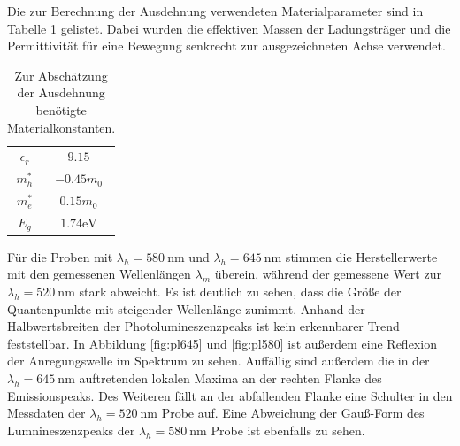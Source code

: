 Die zur Berechnung der Ausdehnung verwendeten Materialparameter sind in Tabelle \ref{tab:const} gelistet. Dabei wurden die effektiven Massen der Ladungsträger und die Permittivität für eine Bewegung senkrecht zur ausgezeichneten Achse verwendet.
\begin{table}[H]
  \centering
  \caption{Zur Abschätzung der Ausdehnung benötigte Materialkonstanten. \cite{dissArens}}
  \label{tab:const}
  \begin{tabular}{c|c}
    \toprule
    $\epsilon_r $ & $ 9.15$ \\
    $m^*_h$ & $ -0.45 m_0$ \\
    $m^*_e $ & $ 0.15 m_0$ \\
    $E_g $ & $1.74\si{\electronvolt}$ \\
    \bottomrule
  \end{tabular}
\end{table}

Für die Proben mit $\lambda_h=\SI{580}{\nano\meter}$ und $\lambda_h=\SI{645}{\nano\meter}$ stimmen die Herstellerwerte mit den gemessenen Wellenlängen $\lambda_m$ überein, während der gemessene Wert zur $\lambda_h=\SI{520}{\nano\meter}$ stark abweicht.
Es ist deutlich zu sehen, dass die Größe der Quantenpunkte mit steigender Wellenlänge zunimmt. Anhand der Halbwertsbreiten der Photolumineszenzpeaks ist kein erkennbarer Trend feststellbar.
In Abbildung \ref{fig:pl645} und \ref{fig:pl580} ist außerdem eine Reflexion der Anregungswelle im Spektrum zu sehen.
Auffällig sind außerdem die in der $\lambda_h=\SI{645}{\nano\meter}$ auftretenden lokalen Maxima an der rechten Flanke des Emissionspeaks. Des Weiteren fällt an der abfallenden Flanke eine Schulter in den Messdaten der $\lambda_h=\SI{520}{\nano\meter}$ Probe auf.
Eine Abweichung der Gauß-Form des Lumnineszenzpeaks der $\lambda_h=\SI{580}{\nano\meter}$ Probe ist ebenfalls zu sehen.

